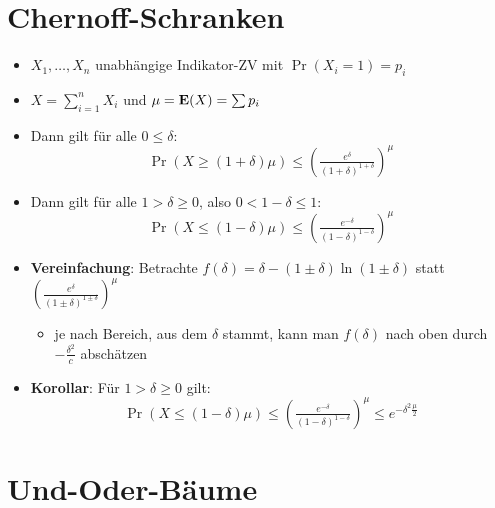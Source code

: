 \section{Chernoff-Schranken}

\begin{itemize}
  \item $ X_1, \dots, X_n $ unabhängige Indikator-ZV mit $ \Pr(X_i = 1) = p_i $
  \item $ X = \sum_{i=1}^nX_i $ und $ \mu = \text{\textbf{E}}(X) = \sum p_i $
  \item Dann gilt für alle $ 0 \leq \delta $:
  \begin{equation*}
    \Pr(X \geq (1+\delta)\mu) \leq \left( \tfrac{e^\delta}{(1+\delta)^{1+\delta}} \right)^\mu
  \end{equation*}
  \item Dann gilt für alle $ 1 > \delta \geq 0 $, also $ 0 < 1-\delta \leq 1 $:
  \begin{equation*}
    \Pr(X \leq (1-\delta)\mu) \leq \left( \tfrac{e^{-\delta}}{(1-\delta)^{1-\delta}} \right)^\mu
  \end{equation*}
  \item \textbf{Vereinfachung}: Betrachte $ f(\delta) = \delta - (1 \pm \delta)\ln(1\pm\delta) $ statt $ \left( \frac{e^\delta}{(1\pm\delta)^{1\pm\delta}} \right)^\mu $
  \begin{itemize}
    \item je nach Bereich, aus dem $ \delta $ stammt, kann man $ f(\delta) $ nach oben durch $ -\frac{\delta^2}{c} $ abschätzen
  \end{itemize}
  \item \textbf{Korollar}: Für $ 1 > \delta \geq 0 $ gilt:
  \begin{equation*}
    \Pr(X \leq (1-\delta)\mu) \leq \left( \tfrac{e^{-\delta}}{(1-\delta)^{1-\delta}} \right)^\mu \leq e^{-\delta^2\tfrac{\mu}{2}}
  \end{equation*}
\end{itemize}

\section{Und-Oder-Bäume}

